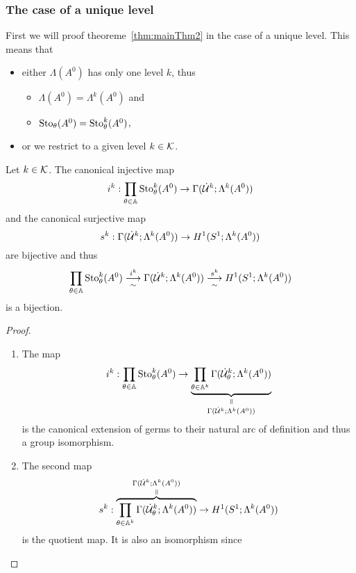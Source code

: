 \subsubsection{The case of a unique level}
\begin{comment}
  \cite[II.3.2]{Loday1994}
\end{comment}
First we will proof theoreme~\ref{thm:mainThm2} in the case of a unique level.
This means that
\begin{itemize}
  \item either $\Lambda(A^0)$ has only one level $k$, thus
    \begin{itemize}
      \item $\Lambda(A^0)=\Lambda^k(A^0)$ and
      \item $\operatorname{Sto}_\theta(A^0)=\operatorname{Sto}_\theta^k(A^0)$,
    \end{itemize}
  \item or we restrict to a given level $k\in\mathcal{K}$.
\end{itemize}
\begin{lem}
  Let $k\in\mathcal{K}$.
  The canonical injective map
  \[
    i^k:\underset{\theta\in\mathbb{A}}\prod\operatorname{Sto}_\theta^k(A^0) \to
    \Gamma(\dot{\mathcal{U}}^k;\Lambda^k(A^0))
  \]
  and the canonical surjective map
  \[
    s^k:\Gamma(\dot{\mathcal{U}}^k;\Lambda^k(A^0))\to H^1(S^1;\Lambda^k(A^0))
  \]
  are bijective and thus
  \[
    \underset{\theta\in\mathbb{A}}\prod\operatorname{Sto}_\theta^k(A^0)
    \underset{\sim}{\overset{i^k}{\longrightarrow}}
    \Gamma(\dot{\mathcal{U}}^k;\Lambda^k(A^0))
    \underset{\sim}{\overset{s^k}{\longrightarrow}}
    H^1(S^1;\Lambda^k(A^0))
  \]
  is a bijection. \TODO[naturality?]
\end{lem}
\begin{proof}
  \begin{enumerate}
    \item The map
      \[
        i^k: \underset{\theta\in\A}\prod\Sto_\theta^k(A^0)
        \to
        \underset{\Gamma(\dot\cU^k;\Lambda^k(A^0))}{%
          \underset{\text{\rotatebox[origin=c]{-90}{$=$}}}{%
            \underbrace{%
              \prod_{\theta\in\A^k}\Gamma(\dot\cU_\theta^k;\Lambda^k(A^0))
            }
        }}
      \]
      is the canonical extension of germs to their natural
      arc of definition and thus a group isomorphism.
    \item The second map
      \[
        s^k:
        \overset{\Gamma(\dot\cU^k;\Lambda^k(A^0))}{%
          \overset{\text{\rotatebox[origin=c]{-90}{$=$}}}{%
            \overbrace{%
              \prod_{\theta\in\A^k}\Gamma(\dot\cU_\theta^k;\Lambda^k(A^0))
            }
        }}
        \to
        H^1(S^1;\Lambda^k(A^0))
      \]
      is the quotient map. It is also an isomorphism since \TODO{}
  \end{enumerate}
\end{proof}

